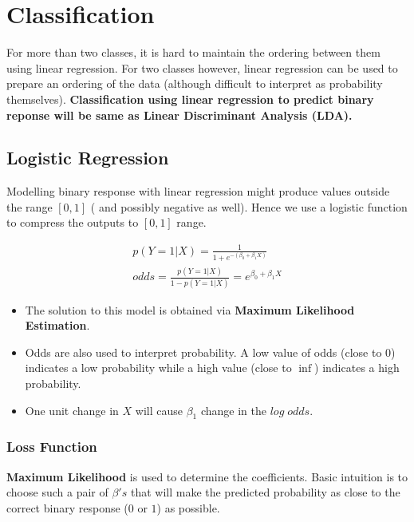 \documentclass[../statistical_learning_notes.tex]{subfiles}
\begin{document}
    \chapter{Classification}
    For more than two classes, it is hard to maintain the ordering between them using linear regression. For two classes however, linear regression can be used to prepare an ordering of the data (although difficult to interpret as probability themselves).\newline 
    \textbf{Classification using linear regression to predict binary reponse will be same as Linear Discriminant Analysis (LDA).}\newline

    \section{Logistic Regression}
    Modelling binary response with linear regression might produce values outside the range $[0,1]$ ( and possibly negative as well). Hence we use a logistic function to compress the outputs to $[0,1]$ range.
    
    \begin{align*}
        p(Y=1|X) = \frac{1}{1+e^{-(\beta_{0}+\beta_{1}X)}}\\
        odds = \frac{p(Y=1|X)}{1-p(Y=1|X)} = e^{\beta_{0} + \beta_{1}X}
    \end{align*}
    \begin{itemize}
        \item The solution to this model is obtained via \textbf{Maximum Likelihood Estimation}.
        \item Odds are also used to interpret probability. A low value of odds (close to $0$) indicates a low probability while a high value (close to $\inf$) indicates a high probability.
        \item One unit change in $X$ will cause $\beta_{1}$ change in the $log\;odds$.
    \end{itemize}

    \subsection{Loss Function}\label{sec:classification_loss_fn}
    \textbf{Maximum Likelihood} is used to determine the coefficients. Basic intuition is to choose such a pair of $\beta's$ that will make the predicted probability as close to the correct binary response ($0$ or $1$) as possible.
\end{document}
